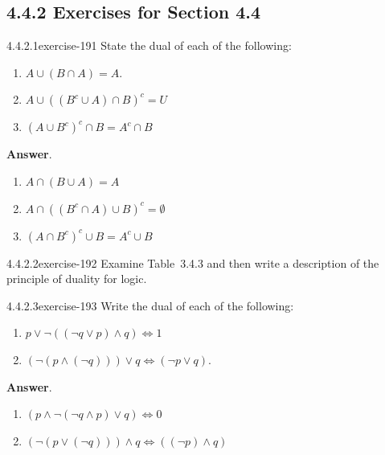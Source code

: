 \documentclass[twoside,10pt,]{book}
\numberwithin{equation}{section}
\begin{document}
\subsection*{4.4.2 Exercises for Section 4.4}
\begin{divisionsolution}{4.4.2.1}{}{exercise-191}%
\hypertarget{p-1669}{}%
State the dual of each of the following:\leavevmode%
\begin{enumerate}[label=(\alph*)]
\item\hypertarget{li-884}{}\hypertarget{p-1670}{}%
\(A \cup  (B \cap  A) = A\).%
\item\hypertarget{li-885}{}\hypertarget{p-1671}{}%
\(A \cup  \left(\left(B^c \cup  A\right) \cap B\right)^c = U\)%
\item\hypertarget{li-886}{}\hypertarget{p-1672}{}%
\(\left(A \cup  B^c\right)^c \cap  B =A^c\cap B\)%
\end{enumerate}
%
\par\smallskip%
\noindent\textbf{Answer}.\quad%
\hypertarget{p-1673}{}%
\leavevmode%
\begin{enumerate}[label=(\alph*)]
\item\hypertarget{li-887}{}\hypertarget{p-1674}{}%
\(A\cap (B\cup A)=A\)%
\item\hypertarget{li-888}{}\hypertarget{p-1675}{}%
\(A \cap \left(\left(B^c\cap A\right)\cup B\right)^c=\emptyset\)%
\item\hypertarget{li-889}{}\hypertarget{p-1676}{}%
\(\left(A\cap B^c\right)^c\cup B=A^c\cup B\)%
\end{enumerate}
%
\end{divisionsolution}%
\begin{divisionsolution}{4.4.2.2}{}{exercise-192}%
\hypertarget{p-1677}{}%
Examine Table~3.4.3 and then write a description of the principle of duality for logic.%
\end{divisionsolution}%
\begin{divisionsolution}{4.4.2.3}{}{exercise-193}%
\hypertarget{p-1678}{}%
Write the dual of each of the following:\leavevmode%
\begin{enumerate}[label=(\alph*)]
\item\hypertarget{li-890}{}\hypertarget{p-1679}{}%
\(p\lor \neg ((\neg q\lor p)\land q)\Leftrightarrow 1\)%
\item\hypertarget{li-891}{}\hypertarget{p-1680}{}%
\((\neg (p \land  (\neg  q ))) \lor  q\Leftrightarrow (\neg p \lor  q)\).%
\end{enumerate}
%
\par\smallskip%
\noindent\textbf{Answer}.\quad%
\hypertarget{p-1681}{}%
\leavevmode%
\begin{enumerate}[label=(\alph*)]
\item\hypertarget{li-892}{}\hypertarget{p-1682}{}%
\((p \land \neg (\neg  q \land p)\lor q) \Leftrightarrow 0\)%
\item\hypertarget{li-893}{}\hypertarget{p-1683}{}%
\((\neg (p \lor  (\neg q)))\land q \Leftrightarrow ((\neg p) \land q)\)%
\end{enumerate}
%
\end{divisionsolution}%
\end{document}
